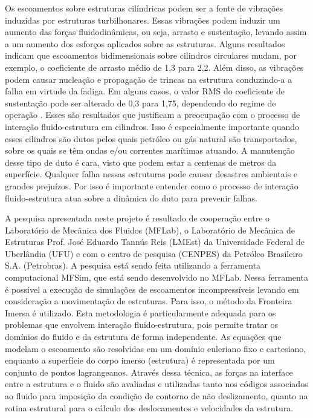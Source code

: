 Os escoamentos sobre estruturas cilíndricas podem ser a fonte de vibrações induzidas por estruturas turbilhonares. Essas vibrações podem induzir um aumento das forças fluidodinâmicas, ou seja, arrasto e sustentação, levando assim a um aumento dos esforços aplicados sobre as estruturas. Alguns resultados indicam que escoamentos bidimensionais sobre cilindros circulares mudam, por exemplo, o coeficiente de arrasto médio de 1,3 para 2,2. Além disso, as vibrações podem causar nucleação e propagação de trincas na estrutura conduzindo-a a falha em virtude da fadiga. Em alguns casos, o valor RMS do coeficiente de sustentação pode ser alterado de 0,3 para 1,75, dependendo do regime de operação \cite{Chern2014}. Esses são resultados que justificam a preocupação com o processo de interação fluido-estrutura em cilindros. Isso é especialmente importante quando esses cilindros são dutos pelos quais petróleo ou gás natural são transportados, sobre os quais se têm ondas e/ou correntes marítimas atuando. A manutenção desse tipo de duto é cara, visto que podem estar a centenas de metros da superfície. Qualquer falha nessas estruturas pode causar desastres ambientais e grandes prejuízos. Por isso é importante entender como o processo de interação fluido-estrutura atua sobre a dinâmica do duto para prevenir falhas.

A pesquisa apresentada neste projeto é resultado de cooperação entre o Laboratório de Mecânica dos Fluidos (MFLab), o Laboratório de Mecânica de Estruturas Prof. José Eduardo Tannús Reis (LMEst) da Universidade Federal de Uberlândia (UFU) e com o centro de pesquisa (CENPES) da Petróleo Brasileiro S.A. (Petrobras). A pesquisa está sendo feita utilizando a ferramenta computacional MFSim, que está sendo desenvolvido no MFLab. Nessa ferramenta é possível a execução de simulações de escoamentos incompressíveis levando em consideração a movimentação de estruturas. Para isso, o método da Fronteira Imersa é utilizado. Esta metodologia é particularmente adequada para os problemas que envolvem interação fluido-estrutura, pois permite tratar os domínios do fluido e da estrutura de forma independente. As equações que modelam o escoamento são resolvidas em um domínio euleriano fixo e cartesiano, enquanto a superfície do corpo imerso (estrutura) é representada por um conjunto de pontos lagrangeanos. Através dessa técnica, as forças na interface entre a estrutura e o fluido são avaliadas e utilizadas tanto nos códigos associados ao fluido para imposição da condição de contorno de não deslizamento, quanto na rotina estrutural para o cálculo dos deslocamentos e velocidades da estrutura.

